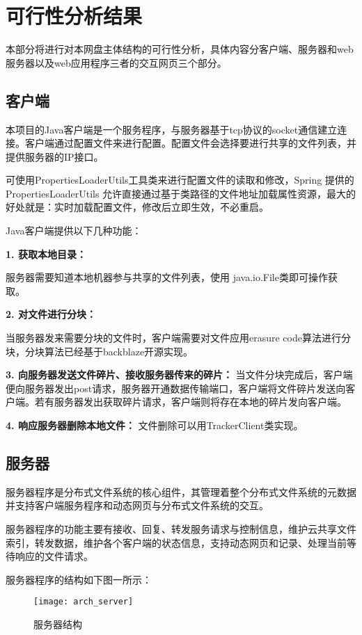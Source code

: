 \chapter{可行性分析结果}

本部分将进行对本网盘主体结构的可行性分析，具体内容分客户端、服务器和web服务器以及web应用程序三者的交互网页三个部分。

\section{客户端}

本项目的Java客户端是一个服务程序，与服务器基于tcp协议的socket通信建立连接。客户端通过配置文件来进行配置。配置文件会选择要进行共享的文件列表，并提供服务器的IP接口。

可使用PropertiesLoaderUtils工具类来进行配置文件的读取和修改，Spring 提供的 PropertiesLoaderUtils 允许直接通过基于类路径的文件地址加载属性资源，最大的好处就是：实时加载配置文件，修改后立即生效，不必重启。

Java客户端提供以下几种功能：

\textbf{1.  获取本地目录：}

服务器需要知道本地机器参与共享的文件列表，使用 java.io.File类即可操作获取。

\textbf{2.  对文件进行分块：}

当服务器发来需要分块的文件时，客户端需要对文件应用erasure code算法进行分块，分块算法已经基于backblaze开源实现。

\textbf{3.  向服务器发送文件碎片、接收服务器传来的碎片：}
当文件分块完成后，客户端便向服务器发出post请求，服务器开通数据传输端口，客户端将文件碎片发送向客户端。若有服务器发出获取碎片请求，客户端则将存在本地的碎片发向客户端。
                 
\textbf{4.  响应服务器删除本地文件：}
文件删除可以用TrackerClient类实现。

\section{服务器}

服务器程序是分布式文件系统的核心组件，其管理着整个分布式文件系统的元数据并支持客户端服务程序和动态网页与分布式文件系统的交互。

服务器程序的功能主要有接收、回复、转发服务请求与控制信息，维护云共享文件索引，转发数据，维护各个客户端的状态信息，支持动态网页和记录、处理当前等待响应的文件请求。

服务器程序的结构如下图一所示：
\begin{figure}[ht]
\centering
\texttt{[image: arch\_server]}
\caption{服务器结构} \label{fig:figure3}
\end{figure}


